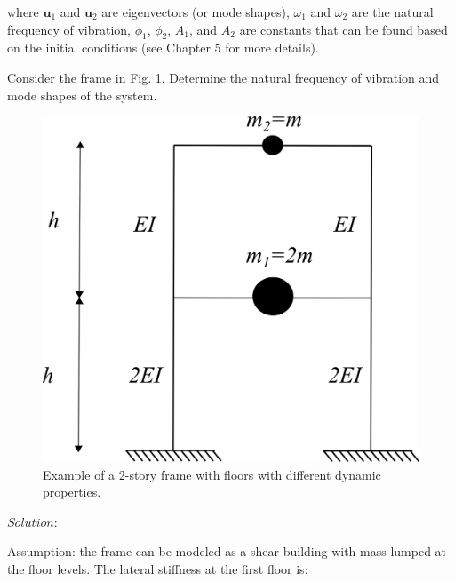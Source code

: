 \documentclass[12pt,letter]{article}
\begin{document}
\noindent where $\mathbf{u}_1$ and  $\mathbf{u}_2$ are eigenvectors (or mode shapes), $\omega_1$ and $\omega_2$ are the natural frequency of vibration, 
$\phi_1$, $\phi_2$, $A_1$, and $A_2$ are constants that can be found based on the initial conditions (see Chapter 5 for more details).

\vspace{4ex}

		
\begin{example}

Consider the frame in Fig. \ref{fig:two_story_frame_ex}. Determine the natural frequency of vibration and mode shapes of the system.

\begin{figure}[H]
	\centering
	\includegraphics{../figures/two_story_frame_example.png}
	\caption{Example of a 2-story frame with floors with different dynamic properties.}
	\label{fig:two_story_frame_ex}
\end{figure}




\noindent $Solution$:

\vspace{1ex}
	
Assumption: the frame can be modeled as a shear building with mass lumped at the floor levels. The lateral stiffness at the first floor is:


\end{example}
\end{document}
